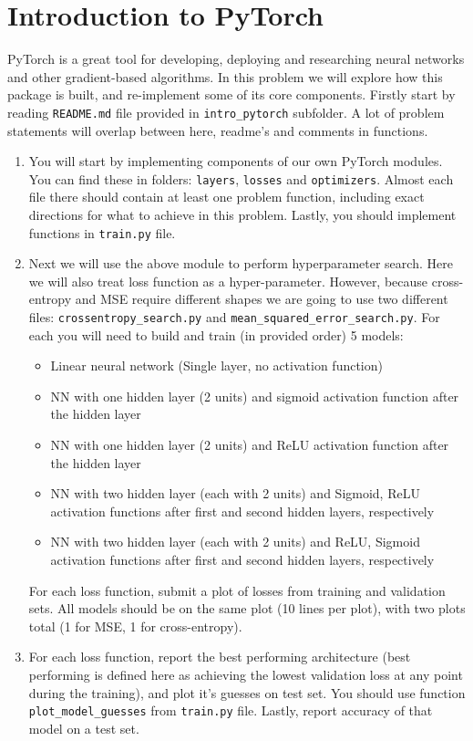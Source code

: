 \documentclass{article}
\begin{document}
\section*{Introduction to PyTorch}
\begin{aprob}
    \label{code-pytorch}
    PyTorch is a great tool for developing, deploying and researching neural networks and other gradient-based algorithms.
    In this problem we will explore how this package is built, and re-implement some of its core components.
    Firstly start by reading \texttt{README.md} file provided in \texttt{intro\_pytorch} subfolder.
    A lot of problem statements will overlap between here, readme's and comments in functions.
    
    \begin{enumerate}
        \item {} You will start by implementing components of our own PyTorch modules. You can find these in folders: \texttt{layers}, \texttt{losses} and \texttt{optimizers}. Almost each file there should contain at least one problem function, including exact directions for what to achieve in this problem. Lastly, you should implement functions in \texttt{train.py} file.
        \item {} Next we will use the above module to perform hyperparameter search. Here we will also treat loss function as a hyper-parameter. However, because cross-entropy and MSE require different shapes we are going to use two different files: \texttt{crossentropy\_search.py} and \texttt{mean\_squared\_error\_search.py}.
        For each you will need to build and train (in provided order) 5 models:
        \begin{itemize}
            \item Linear neural network (Single layer, no activation function)
            \item NN with one hidden layer (2 units) and sigmoid activation function after the hidden layer
            \item NN with one hidden layer (2 units) and ReLU activation function after the hidden layer
            \item NN with two hidden layer (each with 2 units) and Sigmoid, ReLU activation functions after first and second hidden layers, respectively
            \item NN with two hidden layer (each with 2 units) and ReLU, Sigmoid activation functions after first and second hidden layers, respectively
        \end{itemize}
        For each loss function, submit a plot of losses from training and validation sets. All models should be on the same plot (10 lines per plot), with two plots total (1 for MSE, 1 for cross-entropy).
        \item {} For each loss function, report the best performing architecture (best performing is defined here as achieving the lowest validation loss at any point during the training), and plot it's guesses on test set. You should use function \texttt{plot\_model\_guesses} from \texttt{train.py} file. Lastly, report accuracy of that model on a test set.
    \end{enumerate}
    

\end{aprob}
\end{document}

